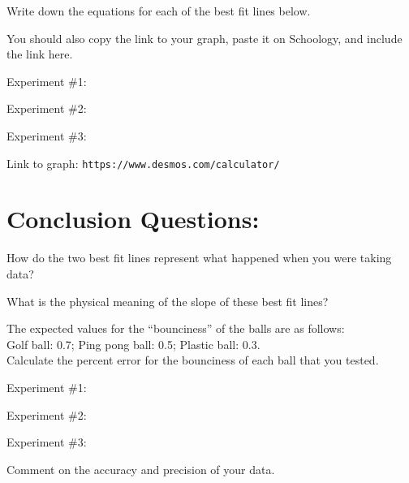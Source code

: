 \documentclass[10pt]{exam}
\begin{document}
Write down the equations for each of the best fit lines below.  

You should also copy the link to your graph, paste it on Schoology, and include the link here.

\vspace{1em}

Experiment \#1:

\vspace{2em}

Experiment \#2:

\vspace{2em}

Experiment \#3:

\vspace{4em}

Link to graph: \texttt{https://www.desmos.com/calculator/}\fillin[][10em]

\vspace{1em}

\pagebreak

\section*{Conclusion Questions:}

\begin{questions}

  \question
  How do the two best fit lines represent what happened when you were taking data?
  \vs

  \question
  What is the physical meaning of the slope of these best fit lines?
  \vs

  \question
  The expected values for the ``bounciness'' of the balls are as follows: \\
  Golf ball: 0.7; \hspace{3em} 
  Ping pong ball: 0.5; \hspace{3em}  
  Plastic ball: 0.3. \\
  Calculate the percent error for the bounciness of each ball that you tested.

    \vspace{1em}

    Experiment \#1:

    \vspace{5em}

    Experiment \#2:

    \vspace{5em}

    Experiment \#3:

    \vspace{5em}


  \question
  Comment on the accuracy and precision of your data.
  \vs

\end{questions}
\end{document}
